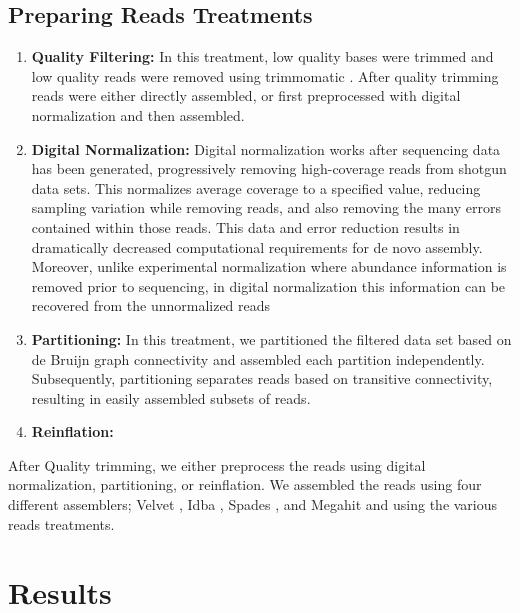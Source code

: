 \subsection*{Preparing Reads Treatments  }
\begin{enumerate}
 \item {\bf Quality Filtering:} In this treatment, low quality bases were trimmed and low quality reads were removed using trimmomatic \cite{trimmomatic}. After quality trimming reads were either directly assembled, or first
 preprocessed with digital normalization and then assembled.

 \item {\bf Digital Normalization:} Digital normalization works after sequencing data has been generated, progressively
removing high-coverage reads from shotgun data sets. This normalizes average coverage to a
specified value, reducing sampling variation while removing reads, and also removing the many errors
contained within those reads. This data and error reduction results in dramatically decreased computational
requirements for de novo assembly. Moreover, unlike experimental normalization where abundance
information is removed prior to sequencing, in digital normalization this information can be recovered
from the unnormalized reads \cite{Brown2012}
 \item {\bf Partitioning:} In this treatment,  we partitioned the filtered data set based on de Bruijn graph connectivity and assembled each partition independently.  Subsequently, partitioning
separates reads based on transitive connectivity, resulting in easily assembled subsets of
reads.
 \item {\bf Reinflation:} 
\end{enumerate}

After Quality trimming, we either preprocess the reads using digital normalization, partitioning, or reinflation. We assembled the reads using four different assemblers; Velvet \cite{velvet}, Idba \cite{idea}, Spades \cite{spades}, and Megahit \cite{megahit} and using the various reads treatments. 

\section*{Results}

